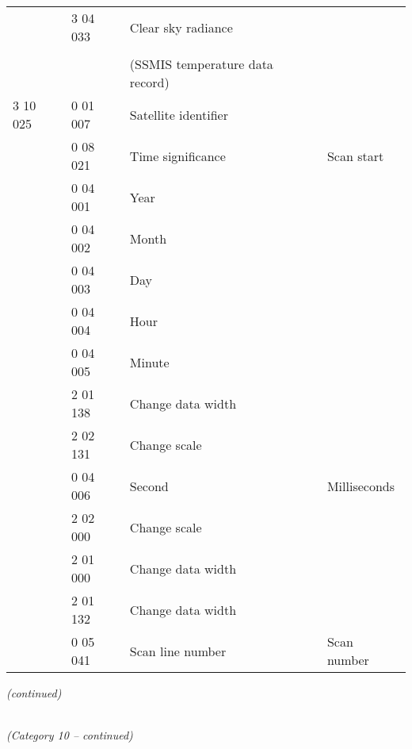 \begin{longtable}[]{@{}llll@{}}
& 3 04 033 & Clear sky radiance &\tabularnewline
& & &\tabularnewline
& & (SSMIS temperature data record) &\tabularnewline
3 10 025 & 0 01 007 & Satellite identifier &\tabularnewline
& 0 08 021 & Time significance & Scan start\tabularnewline
& 0 04 001 & Year &\tabularnewline
& 0 04 002 & Month &\tabularnewline
& 0 04 003 & Day &\tabularnewline
& 0 04 004 & Hour &\tabularnewline
& 0 04 005 & Minute &\tabularnewline
& 2 01 138 & Change data width &\tabularnewline
& 2 02 131 & Change scale &\tabularnewline
& 0 04 006 & Second & Milliseconds\tabularnewline
& 2 02 000 & Change scale &\tabularnewline
& 2 01 000 & Change data width &\tabularnewline
& 2 01 132 & Change data width &\tabularnewline
& 0 05 041 & Scan line number & Scan number\tabularnewline
\bottomrule
\end{longtable}

\emph{(continued)}

\emph{\\
(Category 10 -- continued)}

